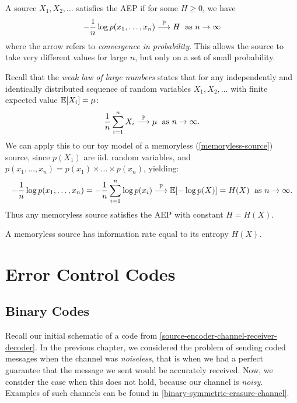 \documentclass{article}
\begin{document}
\begin{definition}
    A source $X_1, X_2, \dots$
    satisfies the AEP if for some $H \geq 0$, we have
    \[
	- \frac{1}{n} \log p(x_1, \dots, x_n)
	\stackrel{\mathbb{P}}{\longrightarrow} H
	\; \text{ as $n \to \infty$}
	\]
	where the arrow refers to \textit{convergence in probability}.
	This allows the source to take very different values for large $n$,
	but only on a set of small probability.
\end{definition}

\begin{remark}
	\label{weak-law-of-large-numbers}
    Recall that the \textit{weak law of large numbers} states that for any
    independently and identically distributed sequence of random variables
    $X_1, X_2, \dots$
    with finite expected value $\mathbb{E}[X_i] = \mu$:
    \[
	\frac{1}{n} \sum_{i=1}^n X_i
	\stackrel{\mathbb{P}}{\longrightarrow} \mu
	\; \text{ as $n \to \infty$}.
	\]
	We can apply this to our toy model of a memoryless (\ref{memoryless-source})
	source, since $p(X_1)$ are iid. random variables,
	and $p(x_1, \dots, x_n) = p(x_1) \times \dots \times p(x_n)$, yielding:
	\[
	- \frac{1}{n} \log p(x_1, \dots, x_n) =
	- \frac{1}{n} \sum_{i=1}^n \log p(x_i)
	\stackrel{\mathbb{P}}{\longrightarrow} \mathbb{E}[-\log p(X)] = H(X)
	\; \text{ as $n \to \infty$}.
	\]
	Thus any memoryless source satisfies the AEP with constant $H = H(X)$.
\end{remark}

\begin{corollary}
    A memoryless source has information rate equal to its entropy $H(X)$.
\end{corollary}


\pagebreak
\section{Error Control Codes}
\subsection{Binary Codes}

Recall our initial schematic of a code from
\ref{source-encoder-channel-receiver-decoder}.
In the previous chapter, we considered the problem of sending coded messages
when the channel was \textit{noiseless},
that is when we had a perfect guarantee that
the message we sent would be accurately received.
Now, we consider the case when this does not hold,
because our channel is \textit{noisy}.
Examples of such channels can be found in \ref{binary-symmetric-erasure-channel}.
\end{document}
